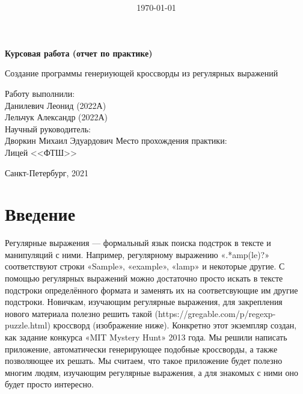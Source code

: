 \documentclass[12pt]{article}
\title{\bf \ReportTheme}
\author{\it \ReportAuthor}
\date{\today}
\begin{document}

    \begin{center}
    \large { {\bf Курсовая работа (отчет по практике) } } 
    
    Создание программы генериующей кроссворды из регулярных выражений \\
    
    \end{center}        
    \begin{flushright}
        Работу выполнили: \\
        Данилевич Леонид (2022А) \\
        Лельчук Александр (2022А) \\
        Научный руководитель: \\
        Дворкин Михаил Эдуардович
        Место прохождения практики: \\
        Лицей <<ФТШ>>
    \end{flushright}
    \begin{center}
        Санкт-Петербург, 2021
    \end{center}        
    \newpage %
    
    \newpage %

    \newpage %
    \part*{Введение}
Регулярные выражения — формальный язык поиска подстрок в тексте и манипуляций с ними. Например, регулярному выражению «.*amp(le)?» соответствуют строки «Sample», «example», «lamp» и некоторые другие. С помощью регулярных выражений можно достаточно просто искать в тексте подстроки определённого формата и заменять их на соответсвующие им другие подстроки. Новичкам, изучающим регулярные выражения, для закрепления нового материала полезно решить такой (https://gregable.com/p/regexp-puzzle.html) кроссворд (изображение ниже). Конкретно этот экземпляр создан, как задание конкурса «MIT Mystery Hunt» 2013 года. Мы решили написать приложение, автоматически генерирующее подобные кроссворды, а также позволяющее их решать. Мы считаем, что такое приложение будет полезно многим людям, изучающим регулярные выражения, а для знакомых с ними оно будет просто интересно.
\end{document}
